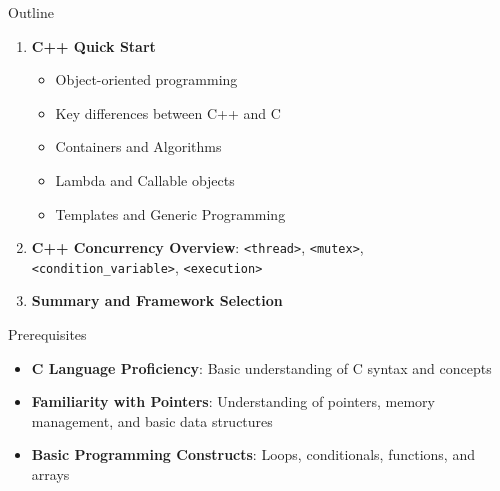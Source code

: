 \begin{frame}[fragile]{ Outline}
	\begin{enumerate}
		\item \textbf{C++ Quick Start}
		      \begin{itemize}
			      \item Object-oriented programming
			      \item Key differences between C++ and C
			      \item Containers and Algorithms
                  \item Lambda and Callable objects
                  \item Templates and Generic Programming
		      \end{itemize}
		\item \textbf{C++ Concurrency Overview}: \texttt{<thread>}, \texttt{<mutex>}, \texttt{<condition\_variable>}, \texttt{<execution>}
		\item \textbf{Summary and Framework Selection}
	\end{enumerate}
\end{frame}

\begin{frame}[fragile]{ Prerequisites}
	\begin{itemize}
		\item \textbf{C Language Proficiency}: Basic understanding of C syntax and concepts
		\item \textbf{Familiarity with Pointers}: Understanding of pointers, memory management, and basic data structures
		\item \textbf{Basic Programming Constructs}: Loops, conditionals, functions, and arrays
	\end{itemize}
\end{frame}
